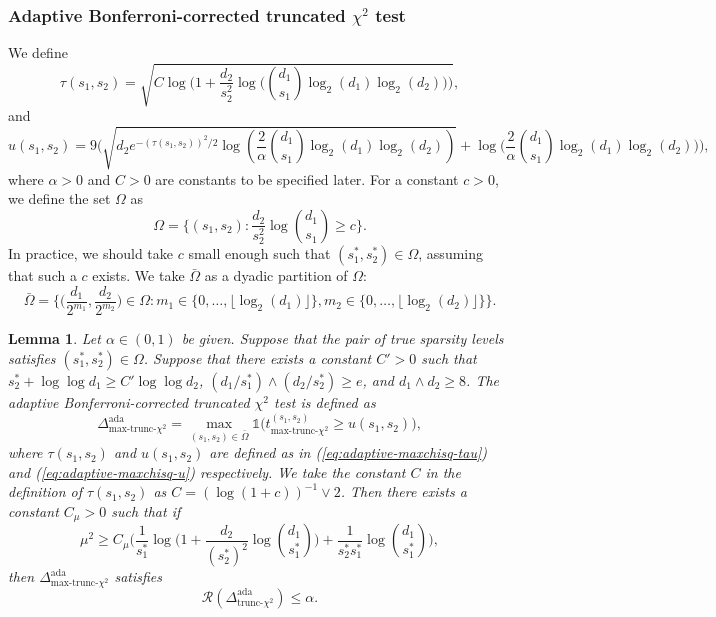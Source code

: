 \documentclass{article}
\newcommand{\cR}{\mathcal{R}}
\newcommand{\one}{\mathds{1}}
\newcommand{\chisqlin}{\text{trunc-$\chi^2$}}
\newcommand{\chisqmax}{\text{max-trunc-$\chi^2$}}
\newtheorem{lemma}{Lemma}
\theoremstyle{remark}
\begin{document}
\subsubsection{Adaptive Bonferroni-corrected truncated $\chi^2$ test}
We define
\begin{equation}\label{eq:adaptive-maxchisq-tau}
    \tau(s_1, s_2) = \sqrt{C\log\Big(1 + \frac{d_2}{s_2^2}\log \Big({d_1 \choose s_1}\log_2(d_1)\log_2(d_2)\Big)\Big)},
\end{equation}
and
\begin{equation}\label{eq:adaptive-maxchisq-u}
    u(s_1, s_2) = 9\Big(\sqrt{d_2e^{-(\tau(s_1, s_2))^2/2}\log(\frac{2}{\alpha}{d_1\choose s_1}\log_2(d_1)\log_2(d_2))} + \log\Big(\frac{2}{\alpha}{d_1 \choose s_1}\log_2(d_1)\log_2(d_2)\Big)\Big),
\end{equation}
where $\alpha > 0$ and $C > 0$ are constants to be specified later. For a constant $c > 0$, we define the set $\Omega$ as 
\[\Omega = \Big\{(s_1, s_2) : \frac{d_2}{s_2^2}\log {d_1 \choose s_1} \geq c\Big\}.\]
In practice, we should take $c$ small enough such that $(s_1^*, s_2^*) \in \Omega$, assuming that such a $c$ exists. We take $\bar{\Omega}$ as a dyadic partition of $\Omega:$
\begin{equation}
    \bar{\Omega} = \Big\{\big(\frac{d_1}{2^{m_1}}, \frac{d_2}{2^{m_2}}\big) \in 
\Omega : m_1 \in \{0, \ldots, \lfloor \log_2(d_1)\rfloor \}, m_2 \in \{0, \ldots, \lfloor \log_2(d_2) \rfloor\}  \Big\}.
\end{equation}
\begin{lemma}\label{lem_ub_ada_max}
    Let $\alpha \in (0,1)$ be given. Suppose that the pair of true sparsity levels satisfies $(s^*_1, s^*_2) \in \Omega$. Suppose that there exists a constant $C' > 0$ such that $s_2^* + \log \log d_1 \geq C' \log \log d_2$, $(d_1/s_1^*) \land  (d_2/s_2^*) \geq e$, and $d_1 \land d_2 \geq 8$. The adaptive Bonferroni-corrected truncated $\chi^2$ test is defined as
\[\Delta^{\text{ada}}_{\chisqmax} = \max_{(s_1, s_2) \in \bar{\Omega}} \one\Big(t^{(s_1, s_2)}_{\chisqmax} \geq u(s_1, s_2)\Big),\]
where $\tau(s_1, s_2)$ and $u(s_1, s_2)$ are defined as in (\ref{eq:adaptive-maxchisq-tau}) and (\ref{eq:adaptive-maxchisq-u}) respectively. We take the constant $C$ in the definition of $\tau(s_1, s_2)$ as $C = (\log(1 + c))^{-1} \lor 2$. Then there exists a constant $C_\mu > 0$ such that if
\[\mu^2 \geq C_\mu\Bigg(\frac{1}{s^*_1}\log\Big(1 + \frac{d_2}{(s^*_2)^2}\log {d_1 \choose s^*_1}\Big) + \frac{1}{s^*_2 s^*_1}\log {d_1 \choose s^*_1}\Bigg),\]
then $\Delta^{\text{ada}}_{\chisqmax}$  satisfies
\[\cR(\Delta^{\text{ada}}_{\chisqlin}) \leq \alpha.\]
\end{lemma}
\end{document}
